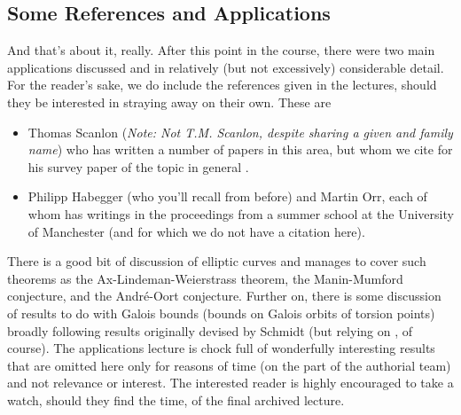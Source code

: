 %
%
%

\subsection{Some References and Applications}
\label{chap:unfinished}

And that's about it, really. After this point in the course, there were two main applications discussed and in relatively (but not excessively) considerable detail. For the reader's sake, we do include the references given in the lectures, should they be interested in straying away on their own. These are
  \begin{itemize}
    \item Thomas Scanlon (\textit{Note: Not T.M. Scanlon, despite sharing a given and family name}) who has written a number of papers in this area, but whom we cite for his survey paper of the topic in general \cite{Scanlon2012CountingSP}.
    \item Philipp Habegger (who you'll recall from before) and Martin Orr, each of whom has writings in the proceedings from a summer school at the University of Manchester (and for which we do not have a citation here).
  \end{itemize}

There is a good bit of discussion of elliptic curves and manages to cover such theorems as the Ax-Lindeman-Weierstrass theorem, the Manin-Mumford conjecture, and the Andr\'e-Oort conjecture. Further on, there is some discussion of results to do with Galois bounds (bounds on Galois orbits of torsion points) broadly following results originally devised by Schmidt \cite{schmidt2018} (but relying on \pw, of course). The applications lecture is chock full of wonderfully interesting results that are omitted here only for reasons of time (on the part of the authorial team) and not relevance or interest. The interested reader is highly encouraged to take a watch, should they find the time, of the final archived lecture.

